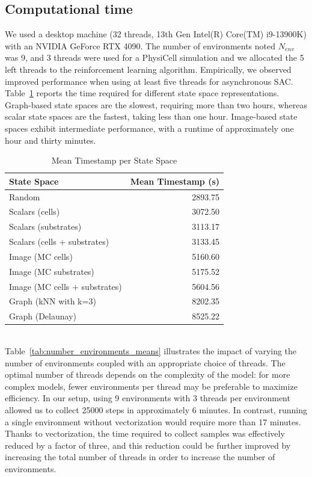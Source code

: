 \documentclass{article}
\begin{document}
\subsection{Computational time}
We used a desktop machine (32 threads, 13th Gen Intel(R) Core(TM) i9-13900K) with an NVIDIA GeForce RTX 4090. The number of environments noted $N_{env}$ was 9, and 3 threads were used for a PhysiCell simulation and we  allocated the 5 left threads to the reinforcement learning algorithm. Empirically, we observed improved performance when using at least five threads for asynchronous SAC. Table~\ref{tab:state_space_means} reports the time required for different state space representations. Graph-based state spaces are the slowest, requiring more than two hours, whereas scalar state spaces are the fastest, taking less than one hour. Image-based state spaces exhibit intermediate performance, with a runtime of approximately one hour and thirty minutes.
\begin{table}[h!]
\centering
\caption{Mean Timestamp per State Space}
\label{tab:state_space_means}
\begin{tabular}{lr}
\hline
\textbf{State Space} & \textbf{Mean Timestamp (s)} \\ \hline
Random                   & 2893.75 \\ \hline
Scalars (cells)           & 3072.50 \\
Scalars (substrates)       & 3113.17 \\
Scalars (cells + substrates) & 3133.45 \\ \hline
Image (MC cells)            & 5160.60 \\
Image (MC substrates)       & 5175.52 \\
Image (MC cells + substrates)  & 5604.56 \\ \hline
Graph (kNN with k=3)                 & 8202.35 \\
Graph (Delaunay)         & 8525.22 \\
\hline
\end{tabular}
\end{table}\\
Table~\ref{tab:number_environments_means} illustrates the impact of varying the number of environments coupled with an appropriate choice of threads. The optimal number of threads depends on the complexity of the model: for more complex models, fewer environments per thread may be preferable to maximize efficiency. In our setup, using 9 environments with 3 threads per environment allowed us to collect 25000 steps in approximately 6 minutes. In contrast, running a single environment without vectorization would require more than 17 minutes. Thanks to vectorization, the time required to collect samples was effectively reduced by a factor of three, and this reduction could be further improved by increasing the total number of threads in order to increase the number of environments.\\
\end{document}
